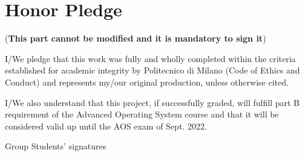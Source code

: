 \documentclass{article}
\begin{document}
\section{Honor Pledge}
(\textbf{This part cannot be modified and it is mandatory to sign it})

I/We pledge that this work was fully and wholly completed within the criteria
established for academic integrity by Politecnico di Milano (Code of Ethics and
Conduct) and represents my/our original production, unless otherwise cited.

I/We also understand that this project, if successfully graded,  will fulfill part B requirement of the
Advanced Operating System course and that it will be considered valid up until
the AOS exam of Sept. 2022.

\begin{flushright}
Group Students' signatures
\end{flushright}
\end{document}
